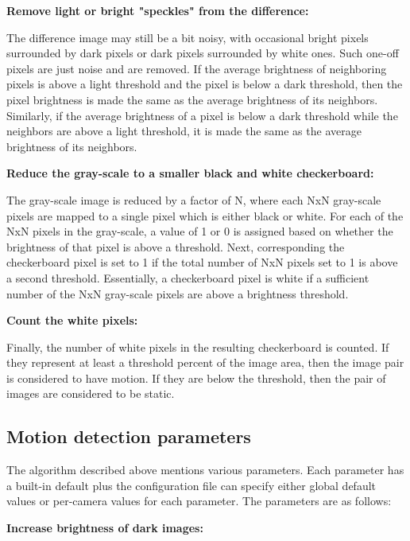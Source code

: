     \I \textbf{Remove light or bright "speckles" from the difference:}

       The difference image may still be a bit noisy, with occasional
       bright pixels surrounded by dark pixels or dark pixels surrounded
       by white ones.  Such one-off pixels are just noise and are removed.
       If the average brightness of neighboring pixels is above a
       light threshold and the pixel is below a dark threshold, then
       the pixel brightness is made the same as the average brightness
       of its neighbors.  Similarly, if the average brightness of a
       pixel is below a dark threshold while the neighbors are above
       a light threshold, it is made the same as the average brightness
       of its neighbors.

    \I \textbf{Reduce the gray-scale to a smaller black and white checkerboard:}

       The gray-scale image is reduced by a factor of N, where each NxN
       gray-scale pixels are mapped to a single pixel which is either
       black or white.  For each of the NxN pixels in the gray-scale,
       a value of 1 or 0 is assigned based on whether the brightness
       of that pixel is above a threshold.  Next, corresponding the
       checkerboard pixel is set to 1 if the total number of NxN pixels
       set to 1 is above a second threshold.  Essentially, a checkerboard
       pixel is white if a sufficient number of the NxN gray-scale pixels
       are above a brightness threshold.

    \I \textbf{Count the white pixels:}

       Finally, the number of white pixels in the resulting checkerboard
       is counted.  If they represent at least a threshold
       percent of the image area, then the image pair is considered
       to have motion.  If they are below the threshold, then the
       pair of images are considered to be static.
    \EE

  \subsection{Motion detection parameters}

    The algorithm described above mentions various parameters.
    Each parameter has a built-in default plus the configuration
    file can specify either global default values or per-camera
    values for each parameter.  The parameters are as follows:

    \BE
    \I \textbf{Increase brightness of dark images:}

